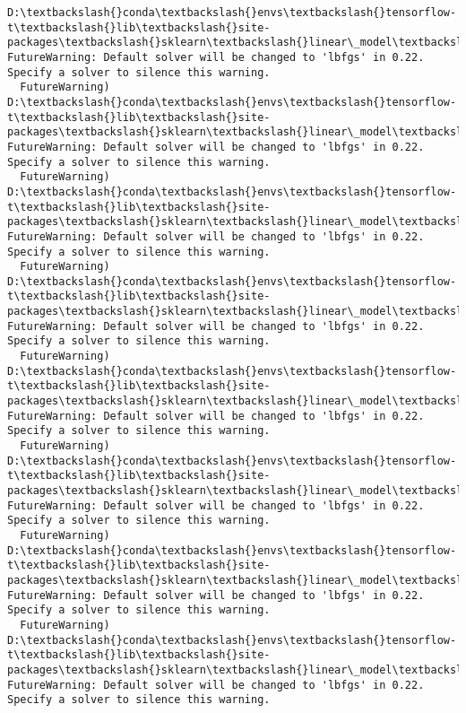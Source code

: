 \documentclass[11pt]{article}
\begin{document}
    \begin{Verbatim}[commandchars=\\\{\}]
D:\textbackslash{}conda\textbackslash{}envs\textbackslash{}tensorflow-t\textbackslash{}lib\textbackslash{}site-packages\textbackslash{}sklearn\textbackslash{}linear\_model\textbackslash{}logistic.py:433: FutureWarning: Default solver will be changed to 'lbfgs' in 0.22. Specify a solver to silence this warning.
  FutureWarning)
D:\textbackslash{}conda\textbackslash{}envs\textbackslash{}tensorflow-t\textbackslash{}lib\textbackslash{}site-packages\textbackslash{}sklearn\textbackslash{}linear\_model\textbackslash{}logistic.py:433: FutureWarning: Default solver will be changed to 'lbfgs' in 0.22. Specify a solver to silence this warning.
  FutureWarning)
D:\textbackslash{}conda\textbackslash{}envs\textbackslash{}tensorflow-t\textbackslash{}lib\textbackslash{}site-packages\textbackslash{}sklearn\textbackslash{}linear\_model\textbackslash{}logistic.py:433: FutureWarning: Default solver will be changed to 'lbfgs' in 0.22. Specify a solver to silence this warning.
  FutureWarning)
D:\textbackslash{}conda\textbackslash{}envs\textbackslash{}tensorflow-t\textbackslash{}lib\textbackslash{}site-packages\textbackslash{}sklearn\textbackslash{}linear\_model\textbackslash{}logistic.py:433: FutureWarning: Default solver will be changed to 'lbfgs' in 0.22. Specify a solver to silence this warning.
  FutureWarning)
D:\textbackslash{}conda\textbackslash{}envs\textbackslash{}tensorflow-t\textbackslash{}lib\textbackslash{}site-packages\textbackslash{}sklearn\textbackslash{}linear\_model\textbackslash{}logistic.py:433: FutureWarning: Default solver will be changed to 'lbfgs' in 0.22. Specify a solver to silence this warning.
  FutureWarning)
D:\textbackslash{}conda\textbackslash{}envs\textbackslash{}tensorflow-t\textbackslash{}lib\textbackslash{}site-packages\textbackslash{}sklearn\textbackslash{}linear\_model\textbackslash{}logistic.py:433: FutureWarning: Default solver will be changed to 'lbfgs' in 0.22. Specify a solver to silence this warning.
  FutureWarning)
D:\textbackslash{}conda\textbackslash{}envs\textbackslash{}tensorflow-t\textbackslash{}lib\textbackslash{}site-packages\textbackslash{}sklearn\textbackslash{}linear\_model\textbackslash{}logistic.py:433: FutureWarning: Default solver will be changed to 'lbfgs' in 0.22. Specify a solver to silence this warning.
  FutureWarning)
D:\textbackslash{}conda\textbackslash{}envs\textbackslash{}tensorflow-t\textbackslash{}lib\textbackslash{}site-packages\textbackslash{}sklearn\textbackslash{}linear\_model\textbackslash{}logistic.py:433: FutureWarning: Default solver will be changed to 'lbfgs' in 0.22. Specify a solver to silence this warning.

\end{Verbatim}
\end{document}
